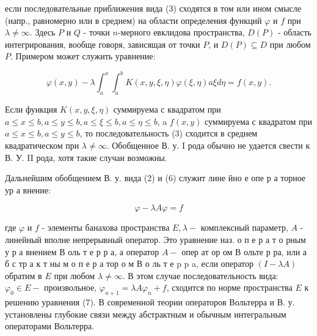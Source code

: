 \documentclass[10pt]{article}
\begin{document}
если последовательные приближения вида (3) сходятся в том или ином смысле (напр., равномерно или в среднем) на области определения функций $\varphi$ и $f$ при $\lambda \neq \infty$. Здесь $P$ и $Q$ - точки $n$-мерного евклидова пространства, $D(P)$ - область интегрирования, вообще говоря, зависящая от точки $P$, и $D(P) \subseteq D$ при любом $P$. Примером может служить уравнение:



\[

\varphi(x, y)-\lambda \int_{a}^{x} \int_{a}^{b} K(x, y, \xi, \eta) \varphi(\xi, \eta) a \xi d \eta=f(x, y) .

\]



Если функция $K(x, y, \xi, \eta)$ суммируема с квадратом при $a \leqslant x \leqslant b, a \leqslant y \leqslant b, a \leqslant \xi \leqslant b, a \leqslant \eta \leqslant b$, a $f(x, y)$ суммируема с квадратом при $a \leqslant x \leqslant b, a \leqslant y \leqslant b$, то последовательность (3) сходится в среднем квадратическом при $\lambda \neq \infty$. Обобщенное В. у. I рода обычно не удается свести к В. У. II рода, хотя такие случаи возможны.



Дальнейшим обобщением В. у. вида (2) и (6) служит лине йно е опе р а торное ур а внение:



\[

\varphi-\lambda A \varphi=f

\]



где $\varphi$ и $f$ - элементы банахова пространства $E, \lambda-$ комплексный параметр, $A$ - линейный вполне непрерывный оператор. Это уравнение наз. о п е р а т о рным у р а внением В оль т е р р а, а оператор $A-$ опер ат ор ом В ольте р ра, или а б с тр а к т ны м о п е р а тор о м В о ль т е p p a, если оператор $(I-\lambda A)$ обратим в $E$ при любом $\lambda \neq \infty$. В этом случае последовательность вида: $\varphi_{0} \in E-$ произвольное, $\varphi_{n+1}=\lambda A \varphi_{n}+f$, сходится по норме пространства $E$ к решению уравнения (7). В современной теории операторов Вольтерра и В. у. установлены глубокие связи между абстрактным и обычным интегральным операторами Вольтерра.
\end{document}
